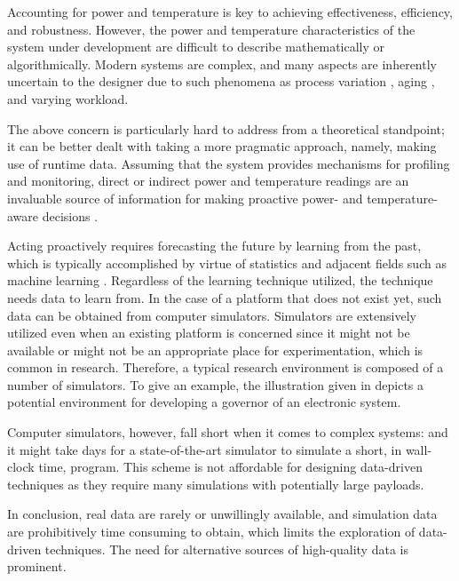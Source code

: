 Accounting for power and temperature is key to achieving effectiveness,
efficiency, and robustness. However, the power and temperature characteristics
of the system under development are difficult to describe mathematically or
algorithmically. Modern systems are complex, and many aspects are inherently
uncertain to the designer due to such phenomena as process variation
\cite{chandrakasan2000}, aging \cite{coskun2006}, and varying workload.

The above concern is particularly hard to address from a theoretical standpoint;
it can be better dealt with taking a more pragmatic approach, namely, making use
of runtime data. Assuming that the system provides mechanisms for profiling and
monitoring, direct or indirect power and temperature readings are an invaluable
source of information for making proactive power- and temperature-aware
decisions \cite{chaudhry2015, coskun2008}.


Acting proactively requires forecasting the future by learning from the past,
which is typically accomplished by virtue of statistics and adjacent fields such
as machine learning \cite{bishop2006}. Regardless of the learning technique
utilized, the technique needs data to learn from. In the case of a platform that
does not exist yet, such data can be obtained from computer simulators.
Simulators are extensively utilized even when an existing platform is concerned
since it might not be available or might not be an appropriate place for
experimentation, which is common in research. Therefore, a typical research
environment is composed of a number of simulators. To give an example, the
illustration given in  depicts a potential environment for
developing a governor of an electronic system.

Computer simulators, however, fall short when it comes to complex systems: and
it might take days for a state-of-the-art simulator to simulate a short, in
wall-clock time, program. This scheme is not affordable for designing
data-driven techniques as they require many simulations with potentially large
payloads.

In conclusion, real data are rarely or unwillingly available, and simulation
data are prohibitively time consuming to obtain, which limits the exploration of
data-driven techniques. The need for alternative sources of high-quality data is
prominent.
